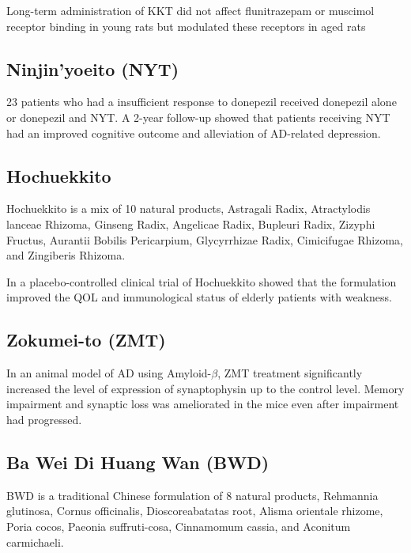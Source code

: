 Long-term administration of KKT did not affect
flunitrazepam or muscimol receptor binding in young rats
but modulated these receptors in aged rats





\subsection{Ninjin'yoeito (NYT)}


23 patients who had a insufficient response to donepezil
received donepezil alone or donepezil and NYT.
A 2-year follow-up showed that patients receiving NYT
had an improved cognitive outcome and alleviation of AD-related depression.
\cite{kudoh2015effect}





\subsection{Hochuekkito}
Hochuekkito is a mix of 10 natural products,
Astragali Radix,
Atractylodis lanceae Rhizoma,
Ginseng Radix,
Angelicae Radix,
Bupleuri Radix,
Zizyphi Fructus,
Aurantii Bobilis Pericarpium,
Glycyrrhizae Radix,
Cimicifugae Rhizoma,
and Zingiberis Rhizoma.
\cite{kiyohara2011polysaccharide}

In a placebo-controlled clinical trial of Hochuekkito
showed that the formulation improved the QOL and immunological status
of elderly patients with weakness.
\cite{satoh2005randomized}

\subsection{Zokumei-to (ZMT)}

In an animal model of AD using Amyloid-$\beta$,
ZMT treatment significantly increased the level of expression of
synaptophysin up to the control level.
Memory impairment and synaptic loss was ameliorated in the mice
even after impairment had progressed.
\cite{tohda2003repair}



\subsection{Ba Wei Di Huang Wan (BWD)}
BWD is a traditional Chinese formulation of 8 natural products,
Rehmannia glutinosa,
Cornus officinalis,
Dioscoreabatatas root,
Alisma orientale rhizome,
Poria cocos,
Paeonia suffruti-cosa,
Cinnamomum cassia,
and Aconitum carmichaeli.

